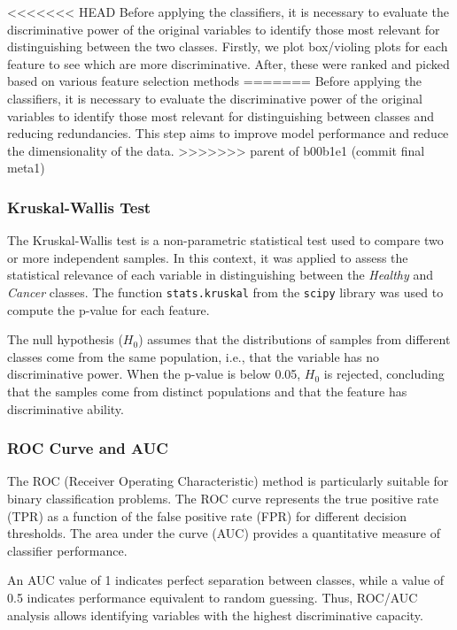 \documentclass[a4paper,12pt]{article}
\begin{document}
<<<<<<< HEAD
Before applying the classifiers, it is necessary to evaluate the discriminative power of the original variables to identify those most relevant for distinguishing between the two classes. Firstly, we plot box/violing plots for each feature to see which are more discriminative. After, these were ranked and picked based on various feature selection methods
=======
Before applying the classifiers, it is necessary to evaluate the discriminative power of the original variables to identify those most relevant for distinguishing between classes and reducing redundancies.  
This step aims to improve model performance and reduce the dimensionality of the data.
>>>>>>> parent of b00b1e1 (commit final meta1)

\subsubsection{Kruskal-Wallis Test}

The Kruskal-Wallis test is a non-parametric statistical test used to compare two or more independent samples.  
In this context, it was applied to assess the statistical relevance of each variable in distinguishing between the \textit{Healthy} and \textit{Cancer} classes.  
The function \texttt{stats.kruskal} from the \texttt{scipy} library was used to compute the p-value for each feature.

The null hypothesis (\(H_0\)) assumes that the distributions of samples from different classes come from the same population, i.e., that the variable has no discriminative power.  
When the p-value is below 0.05, \(H_0\) is rejected, concluding that the samples come from distinct populations and that the feature has discriminative ability.

\subsubsection{ROC Curve and AUC}
\label{sec:ROC}

The ROC (Receiver Operating Characteristic) method is particularly suitable for binary classification problems.  
The ROC curve represents the true positive rate (TPR) as a function of the false positive rate (FPR) for different decision thresholds.  
The area under the curve (AUC) provides a quantitative measure of classifier performance.

An AUC value of 1 indicates perfect separation between classes, while a value of 0.5 indicates performance equivalent to random guessing.  
Thus, ROC/AUC analysis allows identifying variables with the highest discriminative capacity.
\end{document}
